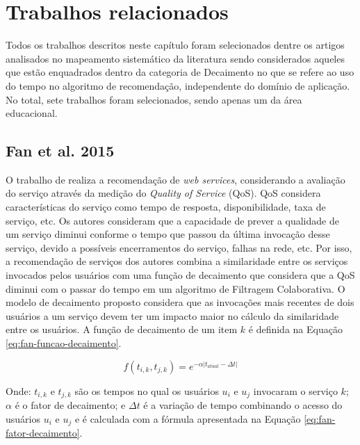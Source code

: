 \chapter{Trabalhos relacionados}\label{chapter:trabalhos-relacionados}

Todos os trabalhos descritos neste capítulo foram selecionados dentre os artigos analisados no mapeamento sistemático
da literatura \cite{de2017time} sendo considerados aqueles que estão enquadrados dentro da categoria de Decaimento no que
se refere ao uso do tempo no algoritmo de recomendação, independente do domínio de aplicação. No total, sete trabalhos
foram selecionados, sendo apenas um da área educacional.

\section{Fan et al. 2015}

O trabalho de  realiza a recomendação de \textit{web services}, considerando a avaliação do serviço
através da medição do \textit{Quality of Service} (QoS). QoS considera características do serviço como tempo de resposta,
disponibilidade, taxa de serviço, etc. Os autores consideram que a capacidade de prever a qualidade de um serviço diminui
conforme o tempo que passou da última invocação desse serviço, devido a possíveis encerramentos do serviço, falhas na
rede, etc. Por isso, a recomendação de serviços dos autores combina a similaridade entre os serviços invocados
pelos usuários com uma função de decaimento que considera que a QoS diminui com o passar do tempo em um algoritmo de Filtragem
Colaborativa. O modelo de decaimento proposto considera que as invocações mais recentes de dois usuários a um serviço devem ter um impacto maior no cálculo da similaridade entre os
usuários. A função de decaimento de um item $k$ é definida na Equação \ref{eq:fan-funcao-decaimento}.

\begin{equation}
  \label{eq:fan-funcao-decaimento}
  f(t_{i,k}, t_{j,k}) = e^{-\alpha \left|t_{atual} - \Delta t \right|}
\end{equation}

Onde: $t_{i,k}$ e $t_{j,k}$ são os tempos no qual os usuários $u_i$ e $u_j$ invocaram o serviço $k$; $\alpha$ é o fator
de decaimento; e $\Delta t$ é a variação de tempo combinando o acesso do usuários $u_i$ e $u_j$ e é calculada com a
fórmula apresentada na Equação \ref{eq:fan-fator-decaimento}.

